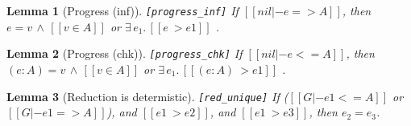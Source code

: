\documentclass[oneside,a4paper]{article}
\newtheorem{theorem}{Theorem}[section]
\newtheorem{lemma}[theorem]{Lemma}
\numberwithin{equation}{section}
\begin{document}
\begin{lemma}[Progress (inf)]\verb|[progress_inf]|
    If $[[nil |- e => A]]$, then 
  $e=v \, \wedge \, [[v \in A]]$ or $\exists \, e_1 . \, [[e ~> e1]]$ .
\end{lemma}

\begin{lemma}[Progress (chk)]\verb|[progress_chk]|
  If $[[nil |- e <= A]]$, then 
  $(e:A)=v \, \wedge \, [[v \in A]]$ or $\exists \, e_1 . \, [[(e : A) ~> e1]]$ .
\end{lemma}

\begin{lemma}[Reduction is determistic]\verb|[red_unique]|
  If ($[[G |- e1 <= A]]$ or $[[G |- e1 => A]]$),
  and $[[e1 ~> e2]]$,
  and $[[e1 ~> e3]]$, then 
  $e_2 = e_3$.
\end{lemma}


%
%
%
%
%
%
%
\end{document}
